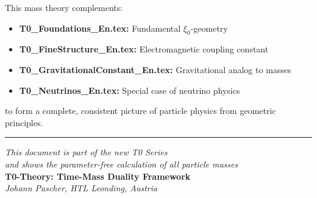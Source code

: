 \documentclass[12pt,a4paper]{article}
\begin{document}
	This mass theory complements:
	\begin{itemize}
		\item \textbf{T0\_Foundations\_En.tex:} Fundamental $\xi_0$-geometry
		\item \textbf{T0\_FineStructure\_En.tex:} Electromagnetic coupling constant
		\item \textbf{T0\_GravitationalConstant\_En.tex:} Gravitational analog to masses
		\item \textbf{T0\_Neutrinos\_En.tex:} Special case of neutrino physics
	\end{itemize}
	
	to form a complete, consistent picture of particle physics from geometric principles.
	
	\begin{center}
		\hrule
		\vspace{0.5cm}
		\textit{This document is part of the new T0 Series}\\
		\textit{and shows the parameter-free calculation of all particle masses}\\
		\vspace{0.3cm}
		\textbf{T0-Theory: Time-Mass Duality Framework}\\
		\textit{Johann Pascher, HTL Leonding, Austria}\\
	\end{center}
	
\end{document}
